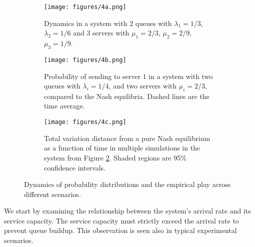 \begin{figure*}[h!]
\vspace{8pt}
    \centering
    \begin{subfigure}{.325\textwidth}
        \texttt{[image: figures/4a.png]} %
        \caption{Dynamics in a system with $2$ queues with $\lambda_1 = 1/3$, $\lambda_2 = 1/6$ and 3 servers with $\mu_1 = 2/3$, $\mu_2 = 2/9$, $\mu_3 = 1/9$.\vspace{22pt}}
        \label{fig:fig3a-dynamics}
    \end{subfigure}
    \hfill
    \begin{subfigure}{.325\textwidth}
        \texttt{[image: figures/4b.png]} %
        \caption{Probability of sending to server 1 in 
        a system with two queues with 
        $\lambda_i = 1/4$, and two servers with $\mu_i = 2/3$, compared to the Nash equilibria. Dashed lines are the time average.}
        \label{fig:fig3b-dynamics-and-NE}
    \end{subfigure}
    \hfill
    \begin{subfigure}{.325\textwidth}
        \texttt{[image: figures/4c.png]} %
        \caption{Total variation distance  
        from a pure Nash equilibrium as a function of time in multiple simulations in the system from Figure \ref{fig:fig3b-dynamics-and-NE}. 
        Shaded regions are 95\% confidence intervals.}
        \label{fig:fig3c-TV-from-NE}
    \end{subfigure}
    \caption{Dynamics of probability distributions and the empirical play across different scenarios.}
    \label{fig:fig3-dynamics}
\end{figure*}

We start by examining the relationship between the system's arrival rate and its service capacity. The service capacity must strictly exceed the arrival rate to prevent queue buildup. This observation is seen also in typical experimental scenarios.

